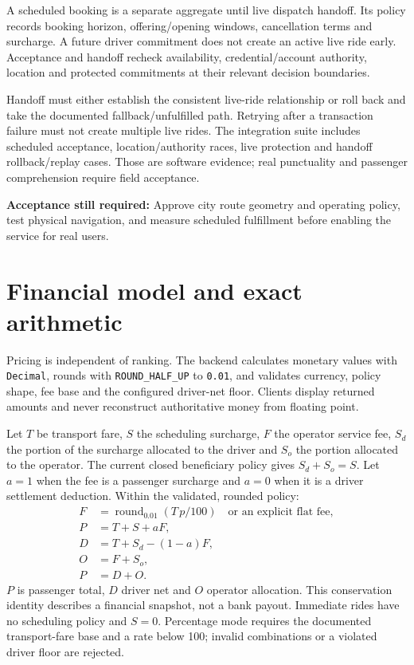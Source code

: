 \documentclass[11pt,a4paper]{article}
\newcommand{\src}[1]{{\small\nolinkurl{#1}}}
\newcommand{\gate}[1]{\par\textbf{Acceptance still required:} #1\par}
\begin{document}
A scheduled booking is a separate aggregate until live dispatch handoff. Its
policy records booking horizon, offering/opening windows, cancellation terms and
surcharge. A future driver commitment does not create an active live ride early.
Acceptance and handoff recheck availability, credential/account authority,
location and protected commitments at their relevant decision boundaries.

Handoff must either establish the consistent live-ride relationship or roll back
and take the documented fallback/unfulfilled path. Retrying after a transaction
failure must not create multiple live rides. The integration suite includes
scheduled acceptance, location/authority races, live protection and handoff
rollback/replay cases. Those are software evidence; real punctuality and passenger
comprehension require field acceptance.
\gate{Approve city route geometry and operating policy, test physical navigation,
and measure scheduled fulfillment before enabling the service for real users.}

\section{Financial model and exact arithmetic}
Pricing is independent of ranking. The backend calculates monetary values with
\src{Decimal}, rounds with \src{ROUND_HALF_UP} to \src{0.01}, and validates currency,
policy shape, fee base and the configured driver-net floor. Clients display
returned amounts and never reconstruct authoritative money from floating point.

Let $T$ be transport fare, $S$ the scheduling surcharge, $F$ the operator service
fee, $S_d$ the portion of the surcharge allocated to the driver and $S_o$ the
portion allocated to the operator. The current closed beneficiary policy gives
$S_d+S_o=S$. Let $a=1$ when the fee is a passenger surcharge and $a=0$ when it is a
driver settlement deduction. Within the validated, rounded policy:
\begin{align*}
 F &= \operatorname{round}_{0.01}(T\,p/100)\quad\text{or an explicit flat fee},\\
 P &= T+S+aF,\\
 D &= T+S_d-(1-a)F,\\
 O &= F+S_o,\\
 P &= D+O.
\end{align*}
$P$ is passenger total, $D$ driver net and $O$ operator allocation. This
conservation identity describes a financial snapshot, not a bank payout.
Immediate rides have no scheduling policy and $S=0$. Percentage mode requires
the documented transport-fare base and a rate below 100; invalid combinations
or a violated driver floor are rejected.
\end{document}
